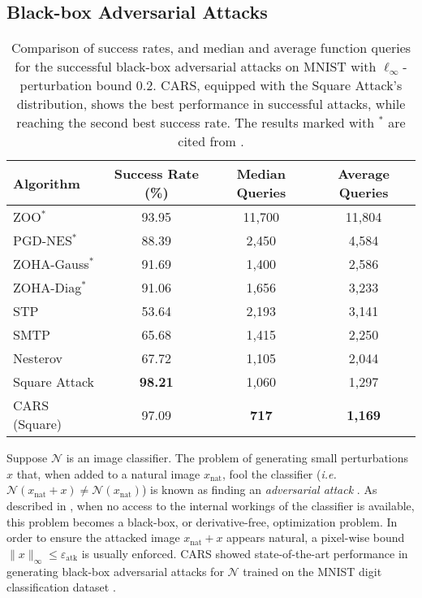\subsection{Black-box Adversarial Attacks}
\begin{table}[t]
    \centering
    \def\ROWCOLOR{black!10!white}
    \begin{tabular}{l c c c}
        \toprule
        Algorithm      & Success Rate (\%) & Median Queries & Average Queries \\
        \midrule
        \rowcolor{\ROWCOLOR}
        ZOO$^*$        & 93.95             & 11,700         & 11,804          \\
        PGD-NES$^*$    & 88.39             & 2,450          & 4,584           \\
        \rowcolor{\ROWCOLOR}
        ZOHA-Gauss$^*$ & 91.69             & 1,400          & 2,586           \\
        ZOHA-Diag$^*$  & 91.06             & 1,656          & 3,233           \\
        \rowcolor{\ROWCOLOR}
        STP            & 53.64             & 2,193          & 3,141           \\
        SMTP           & 65.68             & 1,415          & 2,250           \\
        \rowcolor{\ROWCOLOR}
        Nesterov       & 67.72             & 1,105          & 2,044           \\
        Square Attack  & \textbf{98.21}   & 1,060          & 1,297           \\
        \rowcolor{\ROWCOLOR}
        CARS (Square)  & 97.09             & \textbf{717}  & \textbf{1,169} \\
        \bottomrule
    \end{tabular}
    \caption{Comparison of success rates, and median and average function queries for the successful black-box adversarial attacks on MNIST with $\ell_\infty$-perturbation bound 0.2.
        CARS, equipped with the Square Attack's distribution, shows the best performance in successful attacks, while reaching the second best success rate. The results marked with $^*$ are cited from \cite{ye2018hessian}.
    }
    \label{table: Black Box Attack to a CNN model on the MNIST dataset}
\end{table}
Suppose $\mathcal{N}$ is an image classifier.
The problem of generating small perturbations $x$ that, when added to a natural image $x_{\mathrm{nat}}$, fool the classifier ({\em i.e.} $\mathcal{N}(x_{\mathrm{nat}} + x) \neq \mathcal{N}(x_{\mathrm{nat}})$) is known as finding an {\em adversarial attack} \cite{goodfellow2014explaining}. As described in \cite{chen2017zoo}, when no access to the internal workings of the classifier
is available, this problem becomes a black-box, or derivative-free, optimization problem. In order to ensure the attacked image $x_{\mathrm{nat}} + x$ appears natural, a pixel-wise bound $\|x\|_{\infty} \leq \varepsilon_{\mathrm{atk}}$ is usually enforced. CARS showed state-of-the-art performance in generating black-box adversarial attacks for $\mathcal{N}$ trained on the MNIST digit classification dataset \cite{lecun2010mnist}.

